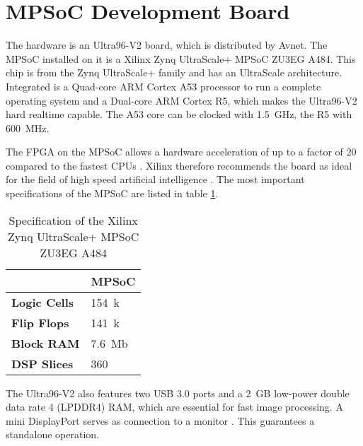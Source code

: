 \section{MPSoC Development Board}
\label{sec:board}

The hardware is an Ultra96-V2 board, which is distributed by Avnet.
The MPSoC installed on it is a Xilinx Zynq UltraScale+ MPSoC ZU3EG A484.
This chip is from the Zynq UltraScale+ family and has an UltraScale architecture.
Integrated is a Quad-core ARM Cortex A53 processor to run a complete operating system and a Dual-core ARM Cortex R5, which makes the Ultra96-V2 hard realtime capable.
The A53 core can be clocked with \SI{1.5}{GHz}, the R5 with \SI{600}{MHz}.

The FPGA on the MPSoC allows a hardware acceleration of up to a factor of 20 compared to the fastest CPUs \cite{AccelerationXilinx}.
Xilinx therefore recommends the board as ideal for the field of high speed artificial intelligence \cite{AIResourcesXilinx}.
The most important specifications of the MPSoC are listed in table \ref{tab:specs_MPSoC}.

\begin{table}[h]
	\caption{Specification of the Xilinx Zynq UltraScale+ MPSoC ZU3EG A484 \cite{XilinxZynq}}
	\label{tab:specs_MPSoC}
	\centering
	\begin{tabular}{ll}
		\toprule
		& \textbf{MPSoC} \\
		\midrule
		\textbf{Logic Cells} & \SI{154}{k} \\
		\textbf{Flip Flops} & \SI{141}{k} \\
		\textbf{Block RAM} & \SI{7.6}{Mb} \\
		\textbf{DSP Slices} & 360 \\
		\bottomrule
	\end{tabular}
\end{table}

The Ultra96-V2 also features two USB 3.0 ports and a \SI{2}{GB} low-power double data rate 4 (LPDDR4) RAM, which are essential for fast image processing.
A mini DisplayPort serves as connection to a monitor \cite{AvnetUltra96v2}.
This guarantees a standalone operation.


